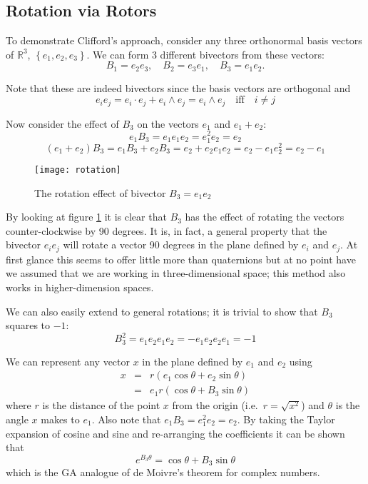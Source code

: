 \subsection{Rotation via Rotors}

To demonstrate Clifford's approach, consider any three orthonormal basis
vectors of $\mathbb{R}^3$, $\left\{e_1, e_2, e_3\right\}$. We can form
3 different bivectors from these vectors:
\begin{displaymath}
B_1 = e_2e_3,\quad B_2 = e_3e_1,\quad B_3 = e_1e_2.
\end{displaymath}

Note that these are indeed bivectors since the basis vectors are orthogonal and
\[
e_ie_j = e_i \cdot e_j + e_i \wedge e_j = e_i \wedge e_j \quad \mbox{iff} \quad i \ne j
\]

Now consider the effect of $B_3$ on the vectors $e_1$ and $e_1 + e_2$:
\begin{displaymath}
e_1B_3 = e_1e_1e_2 = e_1^2e_2=e_2 
\end{displaymath}
\begin{displaymath}
(e_1 + e_2)B_3 = e_1B_3 + e_2B_3 = e_2 + e_2e_1e_2 = e_2 - e_1e_2^2 = e_2 - e_1
\end{displaymath}

\begin{figure}
\centering
\texttt{[image: rotation]}
\caption{The rotation effect of bivector $B_3 = e_1e_2$\label{fig:rotation}}
\end{figure}

By looking at figure \ref{fig:rotation} it is clear that $B_3$ has the effect
of rotating the vectors counter-clockwise by 90 degrees. It is, in fact, a
general property that the bivector $e_ie_j$ will rotate a vector 90 degrees in
the plane defined by $e_i$ and $e_j$. At first glance this seems to offer
little more than quaternions but at no point have we assumed that we are
working in three-dimensional space; this method also works in higher-dimension
spaces.

We can also easily extend to general rotations; it is trivial to
show that $B_3$ squares to $-1$:
\begin{displaymath}
B_3^2 = e_1e_2e_1e_2 = -e_1e_2e_2e_1 = -1
\end{displaymath}

We can represent any vector $x$ in the plane defined by $e_1$ and
$e_2$ using
\begin{eqnarray*}
x & = & r ( e_1 \cos \theta + e_2 \sin \theta) \\
  & = & e_1 r ( \cos \theta + B_3 \sin \theta)
\end{eqnarray*}
where $r$ is the distance of the point $x$ from the origin (i.e.\ $r = \sqrt{x^2}$)
and $\theta$ is the angle $x$ makes to $e_1$. Also note
that $e_1B_3 = e_1^2e_2 = e_2$. By taking the Taylor expansion of cosine
and sine and re-arranging the coefficients it can be shown that
\[
e^{B_3\theta} = \cos \theta + B_3 \sin \theta
\]
which is the GA analogue of de Moivre's theorem for complex
numbers.

